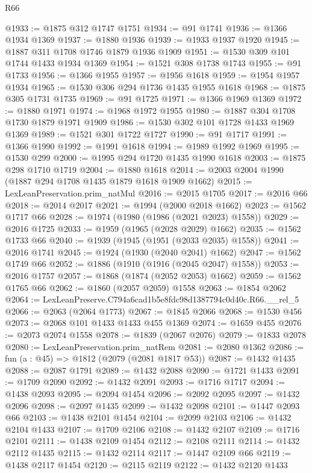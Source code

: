 \begin{lexlean}{R66}
\begin{coremodule}
@1933 := @1875 @312 @1747 @1751
@1934 := @91 @1741
@1936 := @1366 @1934 @1369
@1937 := @1880 @1936
@1939 := @1933 @1937 @1920
@1945 := @1887 @311 @1708 @1746 @1879 @1936 @1909
@1951 := @1530 @309 @101 @1744 @1433 @1934 @1369
@1954 := @1521 @308 @1738 @1743
@1955 := @91 @1733
@1956 := @1366 @1955
@1957 := @1956 @1618
@1959 := @1954 @1957 @1934
@1965 := @1530 @306 @294 @1736 @1435 @1955 @1618
@1968 := @1875 @305 @1731 @1735
@1969 := @91 @1725
@1971 := @1366 @1969 @1369
@1972 := @1880 @1971
@1974 := @1968 @1972 @1955
@1980 := @1887 @304 @1708 @1730 @1879 @1971 @1909
@1986 := @1530 @302 @101 @1728 @1433 @1969 @1369
@1989 := @1521 @301 @1722 @1727
@1990 := @91 @1717
@1991 := @1366 @1990
@1992 := @1991 @1618
@1994 := @1989 @1992 @1969
@1995 := @1530 @299
@2000 := @1995 @294 @1720 @1435 @1990 @1618
@2003 := @1875 @298 @1710 @1719
@2004 := @1880 @1618
@2014 := @2003 @2004 @1990 (@1887 @294 @1708 @1435 @1879 @1618 @1909 @1662)
@2015 := LexLeanPreservation.prim_natMul
@2016 := @2015 @1705
@2017 := @2016 @66
@2018 := @2014 @2017
@2021 := @1994 (@2000 @2018 @1662)
@2023 := @1562 @1717 @66
@2028 := @1974 (@1980 (@1986 (@2021 @2023) @1558))
@2029 := @2016 @1725
@2033 := @1959 (@1965 (@2028 @2029) @1662)
@2035 := @1562 @1733 @66
@2040 := @1939 (@1945 (@1951 (@2033 @2035) @1558))
@2041 := @2016 @1741
@2045 := @1924 (@1930 (@2040 @2041) @1662)
@2047 := @1562 @1749 @66
@2052 := @1886 (@1910 (@1916 (@2045 @2047) @1558))
@2053 := @2016 @1757
@2057 := @1868 (@1874 (@2052 @2053) @1662)
@2059 := @1562 @1765 @66
@2062 := @1860 (@2057 @2059) @1558
@2063 := @1854 @2062
@2064 := LexLeanPreserve.C794a6cad1b5e8fdc98d1387794c0d40c.R66.__rel_5
@2066 := @2063 (@2064 @1773)
@2067 := @1845 @2066
@2068 := @1530 @456
@2073 := @2068 @101 @1433 @1433 @455 @1369
@2074 := @1659 @455
@2076 := @2073 @2074 @1558
@2078 := @1839 (@2067 @2076)
@2079 := @1833 @2078
@2080 := LexLeanPreservation.prim_natRem
@2081 := @2080 @1362
@2086 := fun (a : @45) => @1812 (@2079 (@2081 @1817 @53))
@2087 := @1432 @1435
@2088 := @2087 @1791
@2089 := @1432 @2088
@2090 := @1721 @1433
@2091 := @1709 @2090
@2092 := @1432 @2091
@2093 := @1716 @1717
@2094 := @1438 @2093
@2095 := @2094 @1454
@2096 := @2092 @2095
@2097 := @1432 @2096
@2098 := @2097 @1435
@2099 := @1432 @2098
@2101 := @1447 @2093 @66
@2103 := @1438 @2101 @1454
@2104 := @2099 @2103
@2106 := @1432 @2104 @1433
@2107 := @1709 @2106
@2108 := @1432 @2107
@2109 := @1716 @2101
@2111 := @1438 @2109 @1454
@2112 := @2108 @2111
@2114 := @1432 @2112 @1435
@2115 := @1432 @2114
@2117 := @1447 @2109 @66
@2119 := @1438 @2117 @1454
@2120 := @2115 @2119
@2122 := @1432 @2120 @1433

\end{coremodule}
\end{lexlean}
